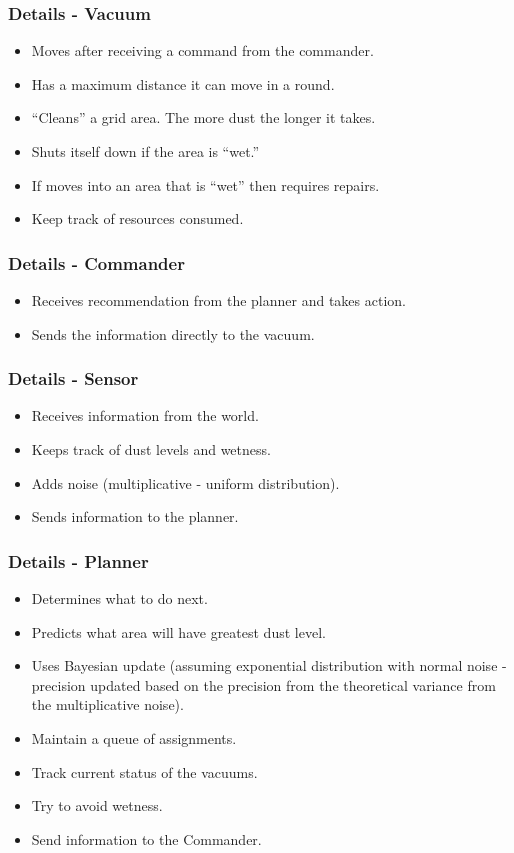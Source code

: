 \documentclass{beamer}
\begin{document}
\begin{frame}
  \frametitle{Details - Vacuum}

  \begin{itemize}
  \item Moves after receiving a command from the commander.
  \item Has a maximum distance it can move in a round.
  \item ``Cleans'' a grid area. The more dust the longer it takes.
  \item Shuts itself down if the area is ``wet.''
  \item If moves into an area that is ``wet'' then requires repairs.
  \item Keep track of resources consumed.
  \end{itemize}
  
\end{frame}

\begin{frame}
  \frametitle{Details - Commander}

  \begin{itemize}
  \item Receives recommendation from the planner and takes action.
  \item Sends the information directly to the vacuum.
  \end{itemize}

\end{frame}


\begin{frame}
  \frametitle{Details - Sensor}
  
  \begin{itemize}
  \item Receives information from the world.
  \item Keeps track of dust levels and wetness.
  \item Adds noise  (multiplicative - uniform distribution).
  \item Sends information to the planner.
  \end{itemize}

\end{frame}


\begin{frame}
  \frametitle{Details - Planner}

  \begin{itemize}
  \item Determines what to do next.
  \item Predicts what area will have greatest dust level.
  \item Uses Bayesian update (assuming exponential distribution with
    normal noise - precision updated based on the precision from the
    theoretical variance from the multiplicative noise).
  \item Maintain a queue of assignments.
  \item Track current status of the vacuums.
  \item Try to avoid wetness.
  \item Send information to the Commander.
  \end{itemize}
  
\end{frame}
\end{document}
